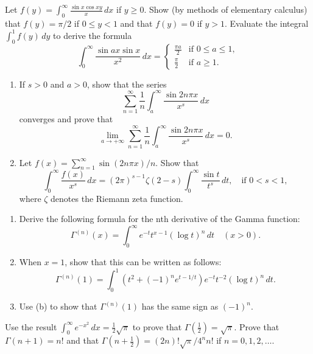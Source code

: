 \begin{problembox}
Let $f(y) = \int_{0}^{\infty} \frac{\sin x \cos xy}{x} \, dx$ if $y \geq 0$. Show (by methods of elementary calculus) that $f(y) = \pi/2$ if $0 \leq y < 1$ and that $f(y) = 0$ if $y > 1$. Evaluate the integral $\int_{0}^{1} f(y) \, dy$ to derive the formula
\[\int_{0}^{\infty} \frac{\sin ax \sin x}{x^{2}} \, dx = \begin{cases} 
\frac{\pi a}{2} & \text{if } 0 \leq a \leq 1, \\
\frac{\pi}{2} & \text{if } a \geq 1.
\end{cases}\]
\end{problembox}

\begin{problembox}
\begin{enumerate}[label=(\alph*)]
    \item If $s > 0$ and $a > 0$, show that the series
    \[\sum_{n=1}^{\infty} \frac{1}{n} \int_{a}^{\infty} \frac{\sin 2n\pi x}{x^{s}} \, dx\]
    converges and prove that
    \[\lim_{a \to +\infty} \sum_{n=1}^{\infty} \frac{1}{n} \int_{a}^{\infty} \frac{\sin 2n\pi x}{x^{s}} \, dx = 0.\]
    \item Let $f(x) = \sum_{n=1}^{\infty} \sin (2n\pi x)/n$. Show that
    \[\int_{0}^{\infty} \frac{f(x)}{x^{s}} \, dx = (2\pi)^{s-1} \zeta (2 - s) \int_{0}^{\infty} \frac{\sin t}{t^{s}} \, dt, \quad \text{if } 0 < s < 1,\]
    where $\zeta$ denotes the Riemann zeta function.
\end{enumerate}
\end{problembox}

\begin{problembox}
\begin{enumerate}[label=(\alph*)]
    \item Derive the following formula for the nth derivative of the Gamma function:
    \[\Gamma^{(n)}(x) = \int_{0}^{\infty} e^{-t} t^{x-1} (\log t)^{n} \, dt \quad (x > 0).\]
    \item When $x = 1$, show that this can be written as follows:
    \[\Gamma^{(n)}(1) = \int_{0}^{1} (t^{2} + (-1)^{n} e^{t-1/t}) e^{-t} t^{-2} (\log t)^{n} \, dt.\]
    \item Use (b) to show that $\Gamma^{(n)}(1)$ has the same sign as $(-1)^{n}$.
\end{enumerate}
\end{problembox}

\begin{problembox}
Use the result $\int_{0}^{\infty} e^{-x^{2}} \, dx = \frac{1}{2} \sqrt{\pi}$ to prove that $\Gamma(\frac{1}{2}) = \sqrt{\pi}$. Prove that $\Gamma(n + 1) = n!$ and that $\Gamma(n + \frac{1}{2}) = (2n)! \sqrt{\pi}/4^{n}n!$ if $n = 0, 1, 2, \ldots$.
\end{problembox}

